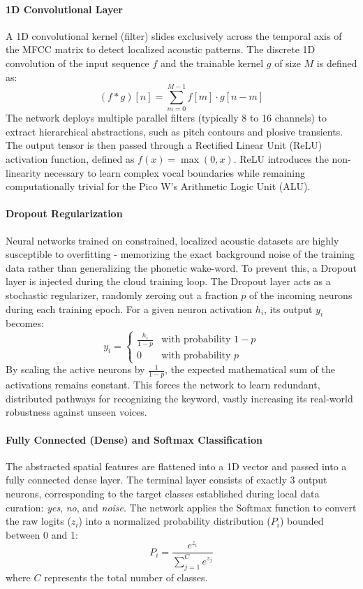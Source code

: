 \documentclass[11pt,a4paper,openany]{book}
\begin{document}
\paragraph{1D Convolutional Layer}
A 1D convolutional kernel (filter) slides exclusively across the temporal axis of the MFCC matrix to detect localized acoustic patterns. The discrete 1D convolution of the input sequence $f$ and the trainable kernel $g$ of size $M$ is defined as:
\begin{equation}
(f * g)[n] = \sum_{m=0}^{M-1} f[m] \cdot g[n - m]
\end{equation}
The network deploys multiple parallel filters (typically 8 to 16 channels) to extract hierarchical abstractions, such as pitch contours and plosive transients. The output tensor is then passed through a Rectified Linear Unit (ReLU) activation function, defined as $f(x) = \max(0, x)$. ReLU introduces the non-linearity necessary to learn complex vocal boundaries while remaining computationally trivial for the Pico W's Arithmetic Logic Unit (ALU).

\paragraph{Dropout Regularization}
Neural networks trained on constrained, localized acoustic datasets are highly susceptible to overfitting - memorizing the exact background noise of the training data rather than generalizing the phonetic wake-word. To prevent this, a Dropout layer is injected during the cloud training loop. The Dropout layer acts as a stochastic regularizer, randomly zeroing out a fraction $p$ of the incoming neurons during each training epoch. For a given neuron activation $h_i$, its output $y_i$ becomes:
\begin{equation}
y_i = \begin{cases} 
      \frac{h_i}{1-p} & \text{with probability } 1-p \\ 
      0 & \text{with probability } p 
   \end{cases}
\end{equation}
By scaling the active neurons by $\frac{1}{1-p}$, the expected mathematical sum of the activations remains constant. This forces the network to learn redundant, distributed pathways for recognizing the keyword, vastly increasing its real-world robustness against unseen voices.

\paragraph{Fully Connected (Dense) and Softmax Classification}
The abstracted spatial features are flattened into a 1D vector and passed into a fully connected dense layer. The terminal layer consists of exactly 3 output neurons, corresponding to the target classes established during local data curation: \textit{yes}, \textit{no}, and \textit{noise}. The network applies the Softmax function to convert the raw logits ($z_i$) into a normalized probability distribution ($P_i$) bounded between 0 and 1:
\begin{equation}
P_i = \frac{e^{z_i}}{\sum_{j=1}^{C} e^{z_j}}
\end{equation}
where $C$ represents the total number of classes.
\end{document}
